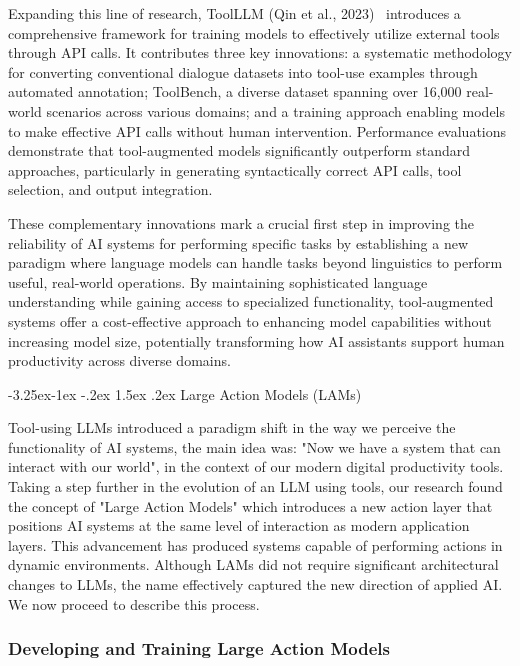 \documentclass[journal,twoside,10pt]{IEEEtran}
\makeatletter
\renewcommand\subsection{\@startsection{subsection}{2}{\z@}%
                       {-3.25ex\@plus -1ex \@minus -.2ex}%
                       {1.5ex \@plus .2ex}%
                       {\normalfont\large\bfseries}}
\makeatother
\begin{document}
Expanding this line of research, ToolLLM (Qin et al., 2023)~\cite{qin2023toolllm} introduces a comprehensive framework for training models to effectively utilize external tools through API calls. It contributes three key innovations: a systematic methodology for converting conventional dialogue datasets into tool-use examples through automated annotation; ToolBench, a diverse dataset spanning over 16,000 real-world scenarios across various domains; and a training approach enabling models to make effective API calls without human intervention. Performance evaluations demonstrate that tool-augmented models significantly outperform standard approaches, particularly in generating syntactically correct API calls, tool selection, and output integration.

These complementary innovations mark a crucial first step in improving the reliability of AI systems for performing specific tasks by establishing a new paradigm where language models can handle tasks beyond linguistics to perform useful, real-world operations. By maintaining sophisticated language understanding while gaining access to specialized functionality, tool-augmented systems offer a cost-effective approach to enhancing model capabilities without increasing model size, potentially transforming how AI assistants support human productivity across diverse domains.

\subsection{Large Action Models (LAMs)}

Tool-using LLMs introduced a paradigm shift in the way we perceive the functionality of AI systems, the main idea was: "Now we have a system that can interact with our world",  in the context of our modern digital productivity tools. Taking a step further in the evolution of  an LLM using tools, our research found the concept of "Large Action Models" which introduces a new action layer that positions AI systems at the same level of interaction as modern application layers. This advancement has produced systems capable of performing actions in dynamic environments. Although LAMs did not require significant architectural changes to LLMs, the name effectively captured the new direction of applied AI. We now proceed to describe this process.

\subsubsection{Developing and Training Large Action Models}
\end{document}
